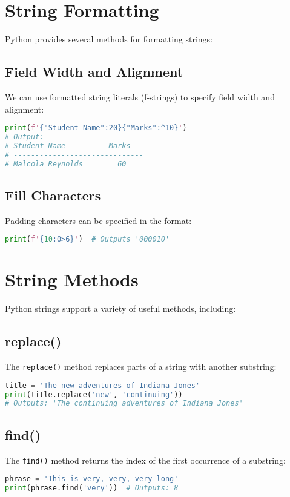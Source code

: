 \documentclass{article}
\begin{document}
\section{String Formatting}
Python provides several methods for formatting strings:
\subsection{Field Width and Alignment}
We can use formatted string literals (f-strings) to specify field width and alignment:
\begin{lstlisting}[language=Python]
print(f'{"Student Name":20}{"Marks":^10}')
# Output:
# Student Name          Marks   
# ------------------------------
# Malcola Reynolds        60    
\end{lstlisting}

\subsection{Fill Characters}
Padding characters can be specified in the format:
\begin{lstlisting}[language=Python]
print(f'{10:0>6}')  # Outputs '000010'
\end{lstlisting}

\section{String Methods}
Python strings support a variety of useful methods, including:
\subsection{replace()}
The \texttt{replace()} method replaces parts of a string with another substring:
\begin{lstlisting}[language=Python]
title = 'The new adventures of Indiana Jones'
print(title.replace('new', 'continuing'))
# Outputs: 'The continuing adventures of Indiana Jones'
\end{lstlisting}

\subsection{find()}
The \texttt{find()} method returns the index of the first occurrence of a substring:
\begin{lstlisting}[language=Python]
phrase = 'This is very, very, very long'
print(phrase.find('very'))  # Outputs: 8
\end{lstlisting}
\end{document}
